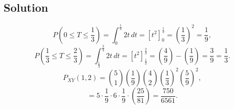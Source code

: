 \documentclass[12pt]{article}
\begin{document}
\subsection*{Solution}
\[
P(0 \leq T \leq \frac{1}{3}) = \int_0^{\frac{1}{3}} 2t \, dt = \left[ t^2 \right]_0^{\frac{1}{3}} = \left(\frac{1}{3}\right)^2 = \frac{1}{9},
\]
\[
P(\frac{1}{3} \leq T \leq \frac{2}{3}) = \int_{\frac{1}{3}}^{\frac{2}{3}} 2t \, dt = \left[ t^2 \right]_{\frac{1}{3}}^{\frac{2}{3}} = \left(\frac{4}{9}\right) - \left(\frac{1}{9}\right) = \frac{3}{9} = \frac{1}{3}.
\]
\[
P_{XY}(1, 2) = \binom{5}{1} \left(\frac{1}{9}\right) \binom{4}{2} \left(\frac{1}{3}\right)^2 \left(\frac{5}{9}\right)^2,
\]
\[
= 5 \cdot \frac{1}{9} \cdot 6 \cdot \frac{1}{9} \cdot \left(\frac{25}{81}\right) = \frac{750}{6561}.
\]
\end{document}

